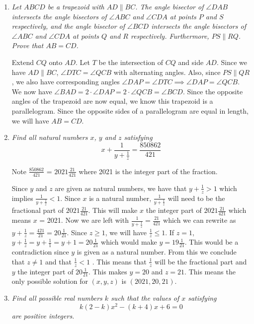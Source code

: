 \documentclass{article}
\begin{document}
\begin{enumerate}[1.]
\item %
{\itshape Let $ABCD$ be a trapezoid with $AD \parallel BC$. The angle bisector of $\angle DAB$ intersects the angle bisectors of $\angle ABC$ and $\angle CDA$ at points $P$ and $S$ respectively, and the angle bisector of $\angle BCD$ intersects the angle bisectors of $\angle ABC$ and $\angle CDA$ at points $Q$ and $R$ respectively. Furthermore, $PS \parallel RQ$. Prove that $AB = CD$. }

Extend $CQ$ onto $AD$. Let $T$ be the intersection of $CQ$ and side $AD$.  Since we have $AD \parallel BC$, $\angle DTC = \angle QCB$ with alternating angles. 
Also, since $PS \parallel QR$, we also have corresponding angles $\angle DAP = \angle DTC \implies \angle DAP = \angle QCB$. We now have $\angle BAD = 2\cdot \angle DAP = 2\cdot \angle QCB = \angle BCD$. Since the opposite angles of the trapezoid are now equal, we know this trapezoid is a parallelogram. Since the opposite sides of a parallelogram are equal in length, we will have $AB = CD$.

\item %
{\itshape Find all natural numbers $x$, $y$ and $z$ satisfying 
$$x + \frac{1}{y + \frac{1}{z}} = \frac{850862}{421}$$}

Note $\frac{850862}{421}$ = $2021\frac{21}{421}$ where 2021 is the integer part of the fraction.

Since $y$ and $z$ are given as natural numbers, we have that $y + \frac{1}{z} > 1$ which implies $\frac{1}{y + \frac{1}{z}} < 1$. Since $x$ is a natural number,  $\frac{1}{y + \frac{1}{z}}$ will need to be the fractional part of  $2021\frac{21}{421}$. This will make $x$ the integer part of $2021\frac{21}{421}$ which means $x$ = 2021. Now we are left with $\frac{1}{y + \frac{1}{z}} = \frac{21}{421}$ which we can rewrite as $y + \frac{1}{z} = \frac{421}{21} = 20\frac{1}{21}$. Since $z\geq1$, we will have $\frac{1}{z}\leq1$. If $z = 1$, $y + \frac{1}{z} = y + \frac{1}{1} = y + 1 = 20\frac{1}{21}$ which would make $y = 19\frac{1}{21}$. This would be a contradiction since $y$ is given as a natural number. From this we conclude that $z\neq 1$ and that $\frac{1}{z}<1$ . This means that $\frac{1}{z}$ will be the fractional part and $y$ the integer part of $20\frac{1}{21}$. This makes $y = 20$ and $z = 21$. 
This means the only possible solution for $(x, y, z)$ is $(2021, 20, 21)$. 

\item %
{\itshape Find all possible real numbers $k$ such that the values of $x$ satisfying
$$k(2 - k)x^2 - (k + 4)x + 6 = 0$$
are positive integers.}


\end{enumerate}
\end{document}
